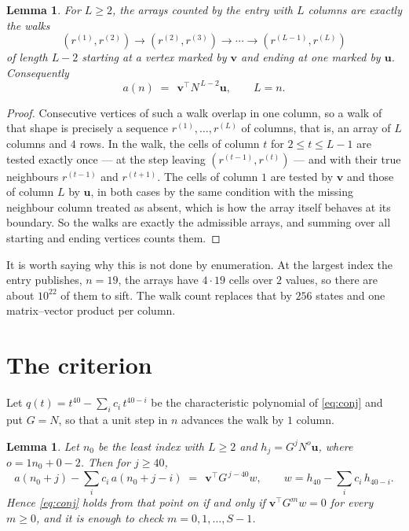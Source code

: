\documentclass[11pt,a4paper]{article}
\theoremstyle{plain}
\newtheorem{lemma}[theorem]{Lemma}
\theoremstyle{definition}
\begin{document}
\begin{lemma}\label{lem:walk}
For $L\ge2$, the arrays counted by the entry with $L$ columns are exactly the walks
\[
(r^{(1)},r^{(2)})\to(r^{(2)},r^{(3)})\to\cdots\to(r^{(L-1)},r^{(L)})
\]
of length $L-2$ starting at a vertex marked by $\mathbf{v}$ and ending at one marked by
$\mathbf{u}$. Consequently
\[
a(n)\;=\;\,\mathbf{v}^{\!\top}N^{\,L-2}\mathbf{u},\qquad L=n .
\]
\end{lemma}

\begin{proof}
Consecutive vertices of such a walk overlap in one column, so a walk of that shape is
precisely a sequence $r^{(1)},\dots,r^{(L)}$ of columns, that is, an array of $L$ columns
and $4$ rows. In the walk, the cells of column $t$ for $2\le t\le L-1$ are tested
exactly once --- at the step leaving $(r^{(t-1)},r^{(t)})$ --- and with their true
neighbours $r^{(t-1)}$ and $r^{(t+1)}$. The cells of column $1$ are tested by
$\mathbf{v}$ and those of column $L$ by $\mathbf{u}$, in both cases by the same condition
with the missing neighbour column treated as absent, which is how the array itself behaves at
its boundary. So the walks are exactly the admissible arrays, and summing over all starting
and ending vertices counts them.
\end{proof}


It is worth saying why this is not done by enumeration. At the largest index the entry
publishes, $n=19$, the arrays have $4\cdot19$ cells over
$2$ values, so there are about $10^{22}$ of them to sift. The
walk count replaces that by $256$ states and one matrix--vector product per column.
\section{The criterion}

Let $q(t)=t^{40}-\sum_i c_i\,t^{40-i}$ be the characteristic polynomial of
\eqref{eq:conj} and put $G=N$, so that a unit step in $n$ advances the walk by
$1$ column.

\begin{lemma}\label{lem:crit}
Let $n_0$ be the least index with $L\ge2$ and $h_j=G^{j}N^{o}\mathbf{u}$, where
$o=1n_0+0-2$. Then for $j\ge40$,
\[
a(n_0+j)-\sum_i c_i\,a(n_0+j-i)\;=\;\,\mathbf{v}^{\!\top}G^{\,j-40}w,
\qquad w=h_{40}-\sum_i c_i\,h_{40-i} .
\]
Hence \eqref{eq:conj} holds from that point on if and only if
$\mathbf{v}^{\!\top}G^{m}w=0$ for every $m\ge0$, and it is enough to check
$m=0,1,\dots,S-1$.
\end{lemma}
\end{document}
